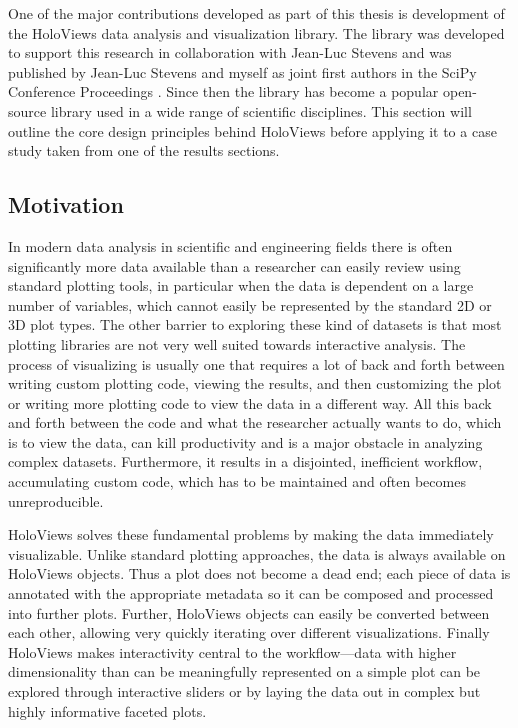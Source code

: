 One of the major contributions developed as part of this thesis is
development of the HoloViews data analysis and visualization library.
The library was developed to support this research in collaboration
with Jean-Luc Stevens and was published by Jean-Luc Stevens and myself
as joint first authors in the SciPy Conference Proceedings
\citep{Stevens2015}. Since then the library has become a popular
open-source library used in a wide range of scientific
disciplines. This section will outline the core design principles
behind HoloViews before applying it to a case study taken from one of
the results sections.

\subsection{Motivation}

In modern data analysis in scientific and engineering fields there is
often significantly more data available than a researcher can easily
review using standard plotting tools, in particular when the data is
dependent on a large number of variables, which cannot easily be
represented by the standard 2D or 3D plot types. The other barrier to
exploring these kind of datasets is that most plotting libraries are
not very well suited towards interactive analysis. The process of
visualizing is usually one that requires a lot of back and forth
between writing custom plotting code, viewing the results, and then
customizing the plot or writing more plotting code to view the data in
a different way. All this back and forth between the code and what the
researcher actually wants to do, which is to view the data, can kill
productivity and is a major obstacle in analyzing complex
datasets. Furthermore, it results in a disjointed, inefficient
workflow, accumulating custom code, which has to be maintained and
often becomes unreproducible.

HoloViews solves these fundamental problems by making the data
immediately visualizable. Unlike standard plotting approaches, the data
is always available on HoloViews objects. Thus a plot does not become a
dead end; each piece of data is annotated with the appropriate
metadata so it can be composed and processed into further
plots. Further, HoloViews objects can easily be converted between each
other, allowing very quickly iterating over different
visualizations. Finally HoloViews makes interactivity central to the
workflow---data with higher dimensionality than can be meaningfully
represented on a simple plot can be explored through interactive
sliders or by laying the data out in complex but highly informative
faceted plots.

